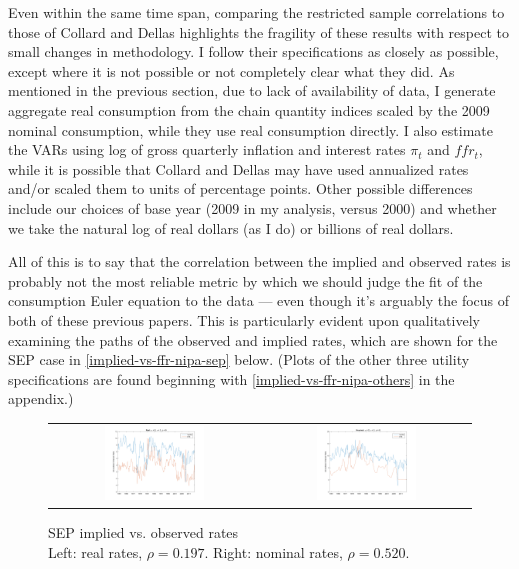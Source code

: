 Even within the same time span, comparing the restricted sample correlations to those of Collard and Dellas highlights the fragility of these results with respect to small changes in methodology. I follow their specifications as closely as possible, except where it is not possible or not completely clear what they did. As mentioned in the previous section, due to lack of availability of data, I generate aggregate real consumption from the chain quantity indices scaled by the 2009 nominal consumption, while they use real consumption directly. I also estimate the VARs using log of gross quarterly inflation and interest rates $\pi_t$ and $ffr_t$, while it is possible that Collard and Dellas may have used annualized rates and/or scaled them to units of percentage points. Other possible differences include our choices of base year (2009 in my analysis, versus 2000) and whether we take the natural log of real dollars (as I do) or billions of real dollars.

All of this is to say that the correlation between the implied and observed rates is probably not the most reliable metric by which we should judge the fit of the consumption Euler equation to the data --- even though it's arguably the focus of both of these previous papers. This is particularly evident upon qualitatively examining the paths of the observed and implied rates, which are shown for the SEP case in \autoref{implied-vs-ffr-nipa-sep} below. (Plots of the other three utility specifications are found beginning with \autoref{implied-vs-ffr-nipa-others} in the appendix.)

\begin{figure}[h]
\centering
\captionsetup{singlelinecheck=false, justification=centering}
\caption{SEP implied vs. observed rates \\ Left: real rates, $\rho = 0.197$. Right: nominal rates, $\rho = 0.520$.}
\label{implied-vs-ffr-nipa-sep}
\begin{tabular}{cc}
\includegraphics[width=0.5\textwidth]{figs/nipa/implied-vs-ffr/real_sep} &
\includegraphics[width=0.5\textwidth]{figs/nipa/implied-vs-ffr/nominal_sep}
\end{tabular}
\end{figure}

